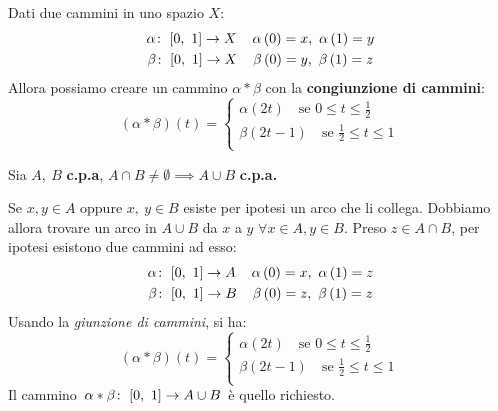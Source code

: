 \begin{define}
	Dati due cammini in uno spazio $X$:
	\begin{gather*}
		\funz{\alpha}{\left[0,\ 1\right]}{X}\quad \alpha\left(0\right)=x,\ \alpha\left(1\right)=y\\
		\funz{\beta}{\left[0,\ 1\right]}{X}\quad \beta\left(0\right)=y,\ \beta\left(1\right)=z\\	
	\end{gather*}
	Allora possiamo creare un cammino $\alpha \ast \beta$ con la \textbf{congiunzione di cammini}:
	\begin{equation}
		\left(\alpha\ast\beta\right)\left(t\right)=\begin{cases}
			\alpha\left(2t\right)\quad\text{se }0\leq t\leq \frac{1}{2}\\
			\beta\left(2t-1\right)\quad\text{se }\frac{1}{2}\leq t\leq 1\\	
		\end{cases}
	\end{equation}
\end{define}
\begin{lemming}
	Sia $A,\ B$ \textbf{c.p.a}, $A\cap B\neq \emptyset\implies A\cup B$ \textbf{c.p.a.}
\end{lemming}
\begin{demonstration}
	Se $x, y\in A$ oppure $x,\ y\in B$ esiste per ipotesi un arco che li collega. Dobbiamo allora trovare un arco in $A\cup B$ da $x$ a $y$ $\forall x\in A, y\in B$. Preso $z\in A\cap B$, per ipotesi esistono due cammini ad esso:
	\begin{gather*}
		\funz{\alpha}{\left[0,\ 1\right]}{A}\quad \alpha\left(0\right)=x,\ \alpha\left(1\right)=z\\
		\funz{\beta}{\left[0,\ 1\right]}{B}\quad \beta\left(0\right)=z,\ \beta\left(1\right)=z\\	
	\end{gather*}
	Usando la \textit{giunzione di cammini}, si ha:
	\begin{equation}
		\left(\alpha\ast\beta\right)\left(t\right)=\begin{cases}
			\alpha\left(2t\right)\quad\text{se }0\leq t\leq \frac{1}{2}\\
			\beta\left(2t-1\right)\quad\text{se }\frac{1}{2}\leq t\leq 1\\	
		\end{cases}
	\end{equation}
	Il cammino $\funz{\alpha\ast\beta}{\left[0,\ 1\right]}{A\cup B}$ è quello richiesto.
\end{demonstration}
